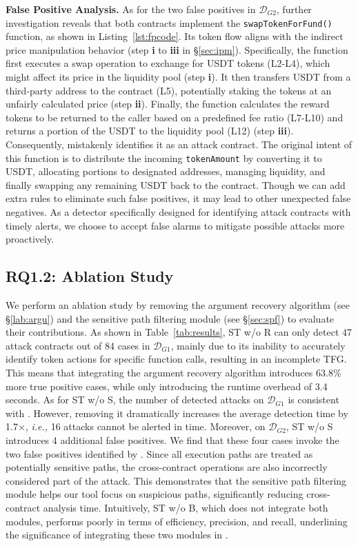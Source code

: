 \noindent
\textbf{False Positive Analysis.}
As for the two false positives in $\mathcal{D}_{G2}$, further investigation reveals that both contracts implement the \texttt{swapTokenForFund()} function, as shown in Listing~\ref{lst:fpcode}.
Its token flow aligns with the indirect price manipulation behavior (step \textbf{i} to \textbf{iii} in \S\ref{sec:ipm}).
Specifically, the function first executes a swap operation to exchange for USDT tokens (L2-L4), which might affect its price in the liquidity pool (step \textbf{i}). It then transfers USDT from a third-party address to the contract (L5), potentially staking the tokens at an unfairly calculated price (step \textbf{ii}). Finally, the function calculates the reward tokens to be returned to the caller based on a predefined fee ratio (L7-L10) and returns a portion of the USDT to the liquidity pool (L12) (step \textbf{iii}). Consequently, {\tool} mistakenly identifies it as an attack contract.
The original intent of this function is to distribute the incoming \texttt{tokenAmount} by converting it to USDT, allocating portions to designated addresses, managing liquidity, and finally swapping any remaining USDT back to the contract.
Though we can add extra rules to eliminate such false positives, it may lead to other unexpected false negatives. As a detector specifically designed for identifying attack contracts with timely alerts, we choose to accept false alarms to mitigate possible attacks more proactively.


\subsection{RQ1.2: Ablation Study}
We perform an ablation study by removing the argument recovery algorithm (see \S\ref{lab:argu}) and the sensitive path filtering module (see \S\ref{sec:spf}) to evaluate their contributions.
As shown in Table~\ref{tab:results}, ST w/o R can only detect 47 attack contracts out of 84 cases in $\mathcal{D}_{G1}$, mainly due to its inability to accurately identify token actions for specific function calls, resulting in an incomplete TFG. This means that integrating the argument recovery algorithm introduces 63.8\% more true positive cases, while only introducing the runtime overhead of 3.4 seconds.
As for ST w/o S, the number of detected attacks on $\mathcal{D}_{G1}$ is consistent with {\tool}. However, removing it dramatically increases the average detection time by 1.7$\times$, \textit{i.e.,} 16 attacks cannot be alerted in time. 
Moreover, on $\mathcal{D}_{G2}$, ST w/o S introduces 4 additional false positives. 
We find that these four cases invoke the two false positives identified by {\tool}. Since all execution paths are treated as potentially sensitive paths, the cross-contract operations are also incorrectly considered part of the attack. This demonstrates that the sensitive path filtering module helps our tool focus on suspicious paths, significantly reducing cross-contract analysis time.
Intuitively, ST w/o B, which does not integrate both modules, performs poorly in terms of efficiency, precision, and recall, underlining the significance of integrating these two modules in {\tool}.


